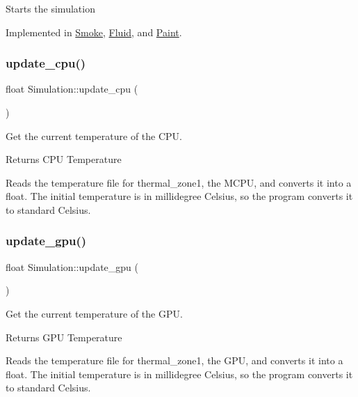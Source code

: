 Starts the simulation 

Implemented in \mbox{\hyperlink{classSmoke_aca6f4c3a6e62bf27920229c5b53ae561}{Smoke}}, \mbox{\hyperlink{classFluid_af249a75d7ef113842c226b8b939c8f90}{Fluid}}, and \mbox{\hyperlink{classPaint_a1f01fcd27e595cc9aacd1ef94e3e1454}{Paint}}.

\mbox{\label{classSimulation_a36aefdee44fabe9b8070363ca9eb80a7}} 
\subsubsection{\texorpdfstring{update\_cpu()}{update\_cpu()}}
{\footnotesize\ttfamily float Simulation\+::update\+\_\+cpu (\begin{DoxyParamCaption}{ }\end{DoxyParamCaption})\hspace{0.3cm}{\ttfamily [inline]}}

Get the current temperature of the C\+PU. \begin{DoxyReturn}{Returns}
C\+PU Temperature
\end{DoxyReturn}
Reads the temperature file for thermal\+\_\+zone1, the M\+C\+PU, and converts it into a float. The initial temperature is in millidegree Celsius, so the program converts it to standard Celsius. \mbox{\label{classSimulation_a16ab6b7e3c5936bae78fc8c2daf658d2}} 
\subsubsection{\texorpdfstring{update\_gpu()}{update\_gpu()}}
{\footnotesize\ttfamily float Simulation\+::update\+\_\+gpu (\begin{DoxyParamCaption}{ }\end{DoxyParamCaption})\hspace{0.3cm}{\ttfamily [inline]}}

Get the current temperature of the G\+PU. \begin{DoxyReturn}{Returns}
G\+PU Temperature
\end{DoxyReturn}
Reads the temperature file for thermal\+\_\+zone1, the G\+PU, and converts it into a float. The initial temperature is in millidegree Celsius, so the program converts it to standard Celsius. 

